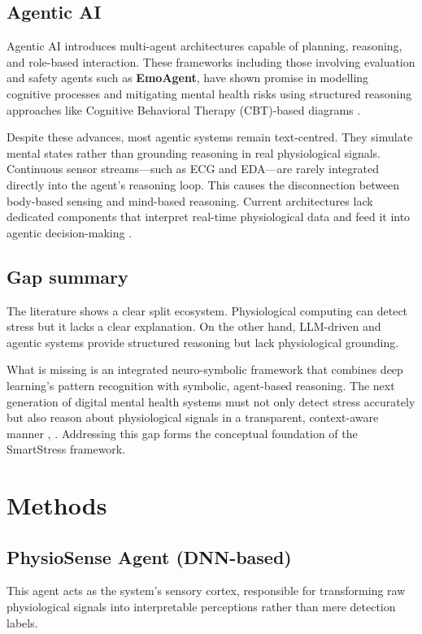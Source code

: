 \documentclass[journal,twoside,web]{ieeecolor}
\begin{document}
\subsection{Agentic AI}
Agentic AI introduces multi-agent architectures capable of planning, reasoning, and role-based interaction. These frameworks including those involving evaluation and safety agents such as \textbf{EmoAgent}, have shown promise in modelling cognitive processes and mitigating mental health risks using structured reasoning approaches like Cognitive Behavioral Therapy (CBT)-based diagrams \cite{qiu2025emoagent}.

Despite these advances, most agentic systems remain text-centred. They simulate mental states rather than grounding reasoning in real physiological signals. Continuous sensor streams—such as ECG and EDA—are rarely integrated directly into the agent’s reasoning loop. This causes the disconnection between body-based sensing and mind-based reasoning. Current architectures lack dedicated components that interpret real-time physiological data and feed it into agentic decision-making \cite{qiu2025emoagent}.

\subsection{Gap summary}
The literature shows a clear split ecosystem. Physiological computing can detect stress but it lacks a clear explanation. On the other hand, LLM-driven and agentic systems provide structured reasoning but lack physiological grounding.

What is missing is an integrated neuro-symbolic framework that combines deep learning’s pattern recognition with symbolic, agent-based reasoning. The next generation of digital mental health systems must not only detect stress accurately but also reason about physiological signals in a transparent, context-aware manner \cite{chin2023potential}, \cite{habicht2024closing}. Addressing this gap forms the conceptual foundation of the SmartStress framework.


\section{Methods}
\label{sec:methods}

\subsection{PhysioSense Agent (DNN-based)}
This agent acts as the system's sensory cortex, responsible for transforming raw physiological signals into interpretable perceptions rather than mere detection labels.
\end{document}
